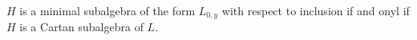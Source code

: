 $H$ is a minimal subalgebra of the form $L_{0, y}$ with respect to inclusion if and
onyl if $H$ is a Cartan subalgebra of $L$.
